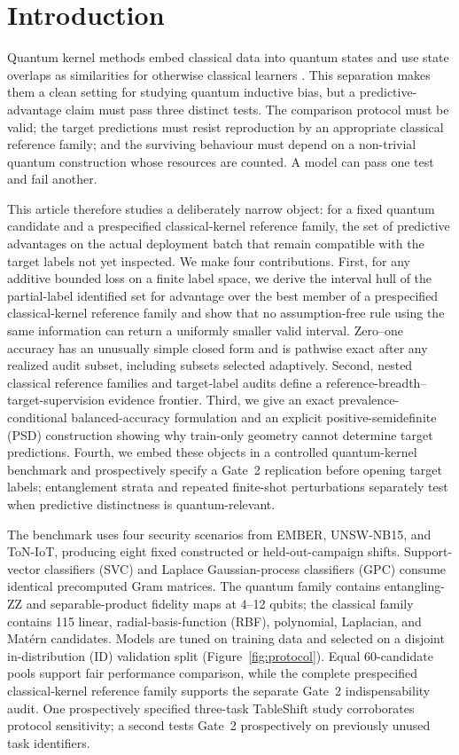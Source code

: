 \documentclass[referee,lineno,pdflatex,sn-vancouver-num]{sn-jnl}
\theoremstyle{thmstyleone}%
\theoremstyle{thmstyletwo}%
\theoremstyle{thmstylethree}%
\begin{document}
\section{Introduction}
\label{sec:introduction}

Quantum kernel methods embed classical data into quantum states and use state overlaps as similarities for otherwise classical learners \cite{havlicek2019quantumenhanced,schuld2019featurehilbert,schuld2021kernelmethods}. This separation makes them a clean setting for studying quantum inductive bias, but a predictive-advantage claim must pass three distinct tests. The comparison protocol must be valid; the target predictions must resist reproduction by an appropriate classical reference family; and the surviving behaviour must depend on a non-trivial quantum construction whose resources are counted. A model can pass one test and fail another.

This article therefore studies a deliberately narrow object: for a fixed quantum candidate and a prespecified classical-kernel reference family, the set of predictive advantages on the actual deployment batch that remain compatible with the target labels not yet inspected. We make four contributions. First, for any additive bounded loss on a finite label space, we derive the interval hull of the partial-label identified set for advantage over the best member of a prespecified classical-kernel reference family and show that no assumption-free rule using the same information can return a uniformly smaller valid interval. Zero--one accuracy has an unusually simple closed form and is pathwise exact after any realized audit subset, including subsets selected adaptively. Second, nested classical reference families and target-label audits define a reference-breadth--target-supervision evidence frontier. Third, we give an exact prevalence-conditional balanced-accuracy formulation and an explicit positive-semidefinite (PSD) construction showing why train-only geometry cannot determine target predictions. Fourth, we embed these objects in a controlled quantum-kernel benchmark and prospectively specify a Gate~2 replication before opening target labels; entanglement strata and repeated finite-shot perturbations separately test when predictive distinctness is quantum-relevant.

The benchmark uses four security scenarios from EMBER, UNSW-NB15, and ToN-IoT, producing eight fixed constructed or held-out-campaign shifts. Support-vector classifiers (SVC) and Laplace Gaussian-process classifiers (GPC) consume identical precomputed Gram matrices. The quantum family contains entangling-ZZ and separable-product fidelity maps at 4--12 qubits; the classical family contains 115 linear, radial-basis-function (RBF), polynomial, Laplacian, and Mat\'ern candidates. Models are tuned on training data and selected on a disjoint in-distribution (ID) validation split (Figure~\ref{fig:protocol}). Equal 60-candidate pools support fair performance comparison, while the complete prespecified classical-kernel reference family supports the separate Gate~2 indispensability audit. One prospectively specified three-task TableShift study corroborates protocol sensitivity; a second tests Gate~2 prospectively on previously unused task identifiers.
\end{document}
